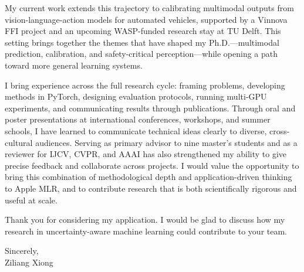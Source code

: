 \documentclass[11pt,a4paper]{article}
\begin{document}
My current work extends this trajectory to calibrating multimodal outputs from vision-language-action models for automated vehicles, supported by a Vinnova FFI project and an upcoming WASP-funded research stay at TU Delft. This setting brings together the themes that have shaped my Ph.D.---multimodal prediction, calibration, and safety-critical perception---while opening a path toward more general learning systems.

I bring experience across the full research cycle: framing problems, developing methods in PyTorch, designing evaluation protocols, running multi-GPU experiments, and communicating results through publications. Through oral and poster presentations at international conferences, workshops, and summer schools, I have learned to communicate technical ideas clearly to diverse, cross-cultural audiences. Serving as primary advisor to nine master's students and as a reviewer for IJCV, CVPR, and AAAI has also strengthened my ability to give precise feedback and collaborate across projects. I would value the opportunity to bring this combination of methodological depth and application-driven thinking to Apple MLR, and to contribute research that is both scientifically rigorous and useful at scale.

Thank you for considering my application. I would be glad to discuss how my research in uncertainty-aware machine learning could contribute to your team.

\vspace{1em}
Sincerely,\\
Ziliang Xiong
\end{document}
